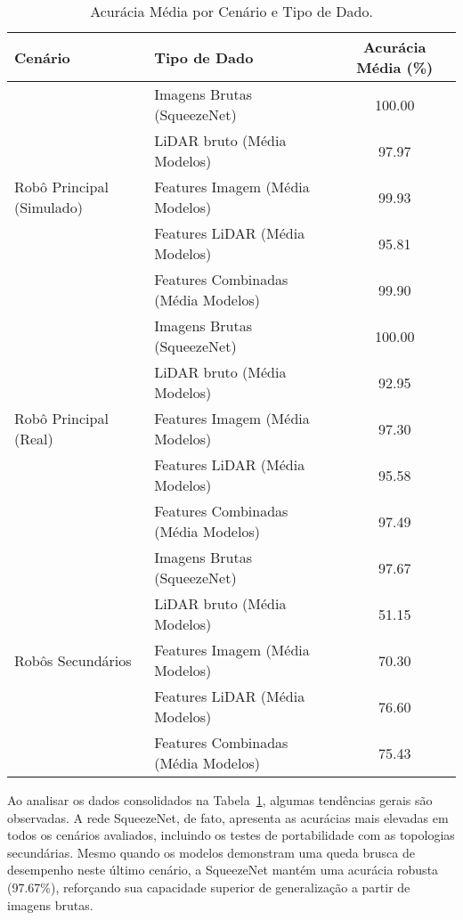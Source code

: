 \begin{table}[H]
\caption{Acurácia Média por Cenário e Tipo de Dado.}
\centering
\begin{tabular}{llc}
\hline
\textbf{Cenário} & \textbf{Tipo de Dado} & \textbf{Acurácia Média (\%)} \\
\hline
\multirow{5}{*}{Robô Principal (Simulado)} & Imagens Brutas (SqueezeNet) & 100.00 \\
                                          & LiDAR bruto (Média Modelos) & 97.97 \\
                                          & Features Imagem (Média Modelos) & 99.93 \\
                                          & Features LiDAR (Média Modelos) & 95.81 \\
                                          & Features Combinadas (Média Modelos) & 99.90 \\
\hline
\multirow{5}{*}{Robô Principal (Real)} & Imagens Brutas (SqueezeNet) & 100.00 \\
                                       & LiDAR bruto (Média Modelos) & 92.95 \\
                                       & Features Imagem (Média Modelos) & 97.30 \\
                                       & Features LiDAR (Média Modelos) & 95.58 \\
                                       & Features Combinadas (Média Modelos) & 97.49 \\
\hline
\multirow{5}{*}{Robôs Secundários} & Imagens Brutas (SqueezeNet) & 97.67 \\
                                                    & LiDAR bruto (Média Modelos) & 51.15 \\
                                                    & Features Imagem (Média Modelos) & 70.30 \\
                                                    & Features LiDAR (Média Modelos) & 76.60 \\
                                                    & Features Combinadas (Média Modelos) & 75.43 \\
\hline
\end{tabular}
\label{tab:resumo_cenario_tipodado_acuracia}
\end{table}

Ao analisar os dados consolidados na Tabela~\ref{tab:resumo_cenario_tipodado_acuracia}, algumas tendências gerais são observadas. A rede SqueezeNet, de fato, apresenta as acurácias mais elevadas em todos os cenários avaliados, incluindo os testes de portabilidade com as topologias secundárias. Mesmo quando os modelos demonstram uma queda brusca de desempenho neste último cenário, a SqueezeNet mantém uma acurácia robusta (97.67\%), reforçando sua capacidade superior de generalização a partir de imagens brutas.

